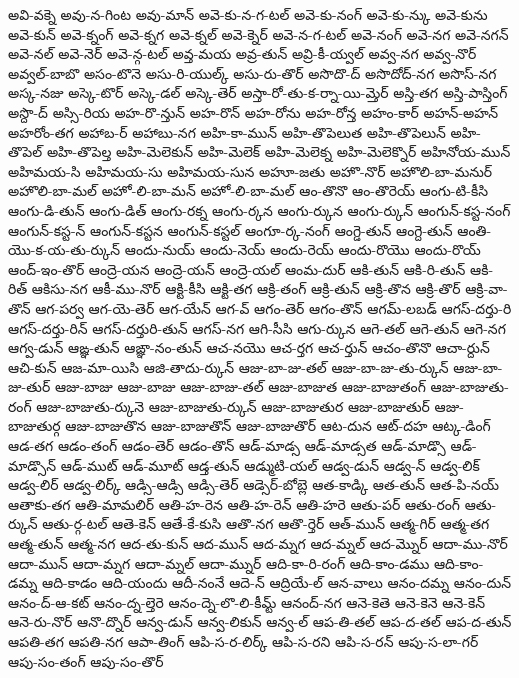 {అవి-వక్నె
అవు-న-గింట
అవు-మాన్
అవె-కు-న-గ-టల్
అవె-కు-నంగ్
అవె-కు-న్కు
అవె-కును
అవె-కున్
అవె-క్నంగ్
అవె-క్నగ
అవె-క్నల్
అవె-క్నెర్
అవె-న-గ-టల్
అవె-నంగ్
అవె-నగ
అవె-నగన్
అవె-నల్
అవె-నెర్
అవె-న్గ-టల్
అవ్త-మయ
అవ్ర-తున్
అవ్రి-కీ-య్వల్
అవ్వ-నగ
అవ్వ-నొర్
అవ్వల్-బాబొ
అసం-టొనె
అసు-రి-యుల్క్
అసు-రు-తొర్
అసొదొ-ద్
అసొదోద్-నగ
అసొస్-నగ
అస్క-నజు
అస్కె-టొర్
అస్కె-డల్
అస్కె-తెర్
అస్తా-రో-తు-క-ర్నా-యి-మ్తెర్
అస్తి-తగ
అస్తి-పాస్తింగ్
అస్దొ-ద్
అస్సి-రియ
అహ-రొ-న్తున్
అహ-రొన్
అహ-రోను
అహ-రోన్త
అహం-కార్
అహన్-అహన్
అహరోం-తగ
అహాబ-ర్
అహాబు-నగ
అహి-కా-మున్
అహి-తొపెలుత
అహి-తొపెలున్
అహి-తొపెల్
అహి-తొపెల్త
అహి-మెలెకున్
అహి-మెలెక్
అహి-మెలెక్న
అహి-మెలెక్నొర్
అహినోయ-మున్
అహిమయ-సి
అహిమయ-సు
అహిమయ-సున
అహూ-జతు
అహొ-నొర్
అహొలి-బా-మనుర్
అహొలి-బా-మల్
అహో-లి-బా-మన్
అహో-లి-బా-మల్
ఆం-తొనొ
ఆం-తొరెయ్
ఆంగు-టి-కీసి
ఆంగు-డి-తున్
ఆంగు-డిత్
ఆంగు-రక్న
ఆంగు-ర్కన
ఆంగు-ర్కున
ఆంగు-ర్కున్
ఆంగున్-కస్ట-నంగ్
ఆంగున్-కస్ట-న్
ఆంగున్-కస్టన
ఆంగున్-కస్టల్
ఆంగూ-ర్క-నంగ్
ఆంగ్డె-తున్
ఆంగ్దె-తున్
ఆంతి-యొ-క-య-తు-ర్కున్
ఆందు-నుయ్
ఆందు-నెయ్
ఆందు-రెయ్
ఆందు-రొయొ
ఆందు-రొయ్
ఆంద్-ఇం-తొర్
ఆంద్రె-యన
ఆంద్రె-యన్
ఆంద్రె-యల్
ఆంమ-దుర్
ఆకి-తున్
ఆకి-రి-తున్
ఆకి-రిత్
ఆకిసు-నగ
ఆకీ-ము-నొర్
ఆక్టి-కీసి
ఆక్టి-తగ
ఆక్రి-తంగ్
ఆక్రి-తున్
ఆక్రి-తొన
ఆక్రి-తొర్
ఆక్రి-వా-తొన్
ఆగ-పర్వ
ఆగ-యె-తెర్
ఆగ-యేన్
ఆగ-వ్
ఆగం-తెర్
ఆగం-తొన్
ఆగమ్-లబడ్
ఆగస్-దర్తు-రి
ఆగస్-దర్తు-రిన్
ఆగస్-దర్తురి-తున్
ఆగస్-నగ
ఆగి-సీసి
ఆగు-ర్కున
ఆగె-తల్
ఆగె-తున్
ఆగె-నగ
ఆగ్వ-డున్
ఆఙ్ఞ-తున్
ఆఙ్ఞా-నం-తున్
ఆచ-నయొ
ఆచ-ర్తగ
ఆచ-ర్తున్
ఆచం-తొనొ
ఆచా-ర్దున్
ఆచి-కున్
ఆజ-మా-యిసి
ఆజి-తాదు-ర్కున్
ఆజు-బా-జు-తల్
ఆజు-బా-జు-తు-ర్కున్
ఆజు-బా-జు-తుర్
ఆజు-బాజు
ఆజు-బాజు
ఆజు-బాజు-తల్
ఆజు-బాజుత
ఆజు-బాజుతంగ్
ఆజు-బాజుతు-రంగ్
ఆజు-బాజుతు-ర్కునె
ఆజు-బాజుతు-ర్కున్
ఆజు-బాజుతుర
ఆజు-బాజుతుర్
ఆజు-బాజుతుర్గ
ఆజు-బాజుతొన
ఆజు-బాజుతొన్
ఆజు-బాజుతొర్
ఆట-దున
ఆట్-దహ
ఆట్క-డింగ్
ఆడ-తగ
ఆడం-తంగ్
ఆడం-తెర్
ఆడం-తొన్
ఆడ్-మాడ్స
ఆడ్-మాడ్సత
ఆడ్-మాడ్సొ
ఆడ్-మాడ్సొన్
ఆడ్-ముట్
ఆడ్-మూట్
ఆడ్త-తున్
ఆడ్ముటి-యల్
ఆడ్వ-డున్
ఆడ్వ-న్
ఆడ్వ-లిక్
ఆడ్వ-లిర్
ఆడ్వ-లిర్క్
ఆడ్సి-ఆడ్సి
ఆడ్సి-తెర్
ఆడ్సెర్-బోబ్లె
ఆత-కాడ్కి
ఆత-తున్
ఆత-పి-నయ్
ఆతాకు-తగ
ఆతి-మామలిర్
ఆతి-హ-రెన
ఆతి-హ-రెన్
ఆతి-హరె
ఆతు-పర్
ఆతు-రంగ్
ఆతు-ర్కున్
ఆతు-ర్గ-టల్
ఆతె-కెన్
ఆతే-కే-కుసి
ఆతొ-నగ
ఆతొ-ర్తెర్
ఆత్-మున్
ఆత్మ-గిర్
ఆత్మ-తగ
ఆత్మ-తున్
ఆత్మ-నగ
ఆద-తు-కున్
ఆద-మున్
ఆద-మ్నగ
ఆద-మ్నల్
ఆద-మ్నొర్
ఆదా-ము-నొర్
ఆదా-మున్
ఆదా-మ్నగ
ఆదా-మ్నల్
ఆదా-మ్నుర్
ఆది-కా-రి-రంగ్
ఆది-కాం-డము
ఆది-కాం-డమ్న
ఆది-కాడం
ఆది-యందు
ఆదీ-నంనే
ఆదె-న్
ఆద్రియే-ల్
ఆన-వాలు
ఆనం-దమ్న
ఆనం-దున్
ఆనం-ద్-ఆ-కట్
ఆనం-ద్న-ల్తెరె
ఆనం-ద్నె-లొ-లి-కీమ్ట్
ఆనంద్-నగ
ఆనె-కెతె
ఆనె-కెనె
ఆనె-కెన్
ఆనె-రు-నొర్
ఆనొ-ద్నొర్
ఆన్వ-డున్
ఆన్వ-లికున్
ఆన్వ-ల్
ఆప-తి-తల్
ఆప-ద-తల్
ఆప-ద-తున్
ఆపతి-తగ
ఆపతి-నగ
ఆపా-తింగ్
ఆపి-స-ర-లిర్క్
ఆపి-స-రని
ఆపి-స-రన్
ఆపు-స-లా-గర్
ఆపు-సం-తంగ్
ఆపు-సం-తొర్
}
